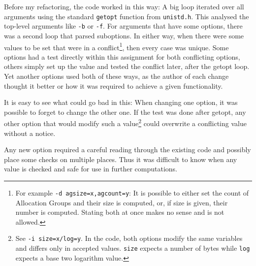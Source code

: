 Before my refactoring, the code worked in this way: A big loop iterated over all arguments using the standard {\tt getopt} function from {\tt unistd.h}. This analysed the top-level arguments like {\tt -b} or {\tt -f}. For arguments that have some options, there was a second loop that parsed suboptions. In either way, when there were some values to be set that were in a conflict\footnote{For example {\tt -d agsize=x,agcount=y}: It is possible to either set the count of Allocation Groups and their size is computed, or, if size is given, their number is computed. Stating both at once makes no sense and is not allowed.}, then every case was unique. Some options had a test directly within this assignment for both conflicting options, others simply set up the value and tested the conflict later, after the getopt loop. Yet another options used both of these ways, as the author of each change thought it better or how it was required to achieve a given functionality.

It is easy to see what could go bad in this: When changing one option, it was possible to forget to change the other one. If the test was done after getopt, any other option that would modify such a value\footnote{See {\tt -i size=x/log=y}. In the code, both options modify the same variables and differs only in accepted values. {\tt size} expects a number of bytes while {\tt log} expects a base two logarithm value.} could overwrite a conflicting value without a notice.

Any new option required a careful reading through the existing code and possibly place some checks on multiple places. Thus it was difficult to know when any value is checked and safe for use in further computations.



